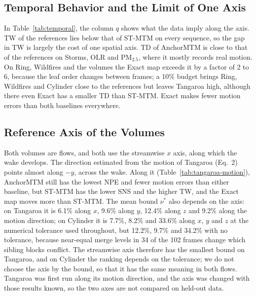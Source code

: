 \documentclass[preprint]{vgtc}
\begin{document}
\subsection{Temporal Behavior and the Limit of One Axis}

In Table~\ref{tab:temporal}, the column $q$ shows what the data imply along the axis. TW of the references lies below that of ST-MTM on every sequence, so the gap in TW is largely the cost of one spatial axis. TD of AnchorMTM is close to that of the references on Storms, OLR and PM$_{2.5}$, where it mostly records real motion. On Ring, Wildfires and the volumes the Exact map exceeds it by a factor of 2 to 6, because the leaf order changes between frames; a 10\% budget brings Ring, Wildfires and Cylinder close to the references but leaves Tangaroa high, although there even Exact has a smaller TD than ST-MTM. Exact makes fewer motion errors than both baselines everywhere.

\subsection{Reference Axis of the Volumes}\label{sec:volume-axis}

Both volumes are flows, and both use the streamwise $x$ axis, along which the wake develops. The direction estimated from the motion of Tangaroa (Eq.~2) points almost along $-y$, across the wake. Along it (Table~\ref{tab:tangaroa-motion}), AnchorMTM still has the lowest NPE and fewer motion errors than either baseline, but ST-MTM has the lower SNS and the higher TW, and the Exact map moves more than ST-MTM. The mean bound $\nu^*$ also depends on the axis: on Tangaroa it is 6.1\% along $x$, 9.6\% along $y$, 12.4\% along $z$ and 9.2\% along the motion direction; on Cylinder it is 7.7\%, 8.2\% and 33.6\% along $x$, $y$ and $z$ at the numerical tolerance used throughout, but 12.2\%, 9.7\% and 34.2\% with no tolerance, because near-equal merge levels in 34 of the 102 frames change which sibling blocks conflict. The streamwise axis therefore has the smallest bound on Tangaroa, and on Cylinder the ranking depends on the tolerance; we do not choose the axis by the bound, so that it has the same meaning in both flows. Tangaroa was first run along its motion direction, and the axis was changed with those results known, so the two axes are not compared on held-out data.
\end{document}
